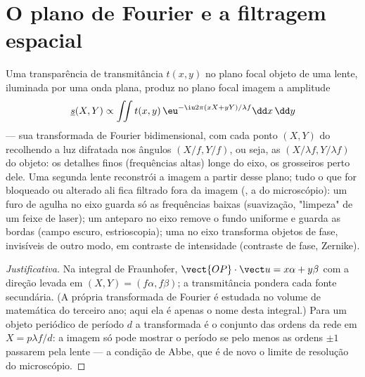 \section{O plano de Fourier e a filtragem espacial}

\begin{proposition}\label{prop:b2:diffraction:fourier}
Uma transparência de transmitância $t(x, y)$ no plano focal objeto de uma
lente, iluminada por uma onda plana, produz no plano focal imagem a
amplitude
\[
\underline s(X, Y) \propto \iint t(x, y)\,\eu^{-\iu2\pi(xX + yY)/\lambda f}\dd x\,\dd y
\]
--- sua transformada de Fourier bidimensional, com cada ponto $(X, Y)$ do
\emph{} recolhendo a luz difratada nos ângulos
$(X/f, Y/f)$, ou seja, as \emph{} $(X/\lambda f, Y/\lambda f)$ do
objeto: os detalhes finos (frequências altas) longe do eixo, os grosseiros
perto dele. Uma segunda lente reconstrói a imagem a partir desse plano; tudo o que
for bloqueado ou alterado ali fica filtrado fora da imagem
(\emph{}, a  do microscópio): um furo de agulha
no eixo guarda só as frequências baixas (suavização, "limpeza" de um
feixe de laser); um anteparo no eixo remove o fundo uniforme e
guarda as bordas (campo escuro, estrioscopia); uma  no
eixo transforma objetos de fase, invisíveis de outro modo, em contraste de intensidade
(contraste de fase, Zernike).
\end{proposition}

\begin{proof}[Justificativa]
Na integral de Fraunhofer, $\vect{OP}\cdot\vect u = x\alpha + y\beta$ com a
direção levada em $(X, Y) = (f\alpha, f\beta)$; a transmitância pondera
cada fonte secundária. (A própria transformada de Fourier é estudada no
volume de matemática do terceiro ano; aqui ela é apenas o nome desta integral.)
Para um objeto periódico de período $d$ a transformada é o conjunto das ordens
da rede em $X = p\lambda f/d$: a imagem só pode mostrar o período se pelo menos
as ordens $\pm1$ passarem pela lente --- a condição de Abbe, que é de novo
o limite de resolução do microscópio.
\end{proof}

